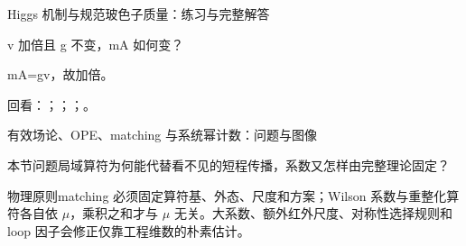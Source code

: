 \begin{frame}[t]{Higgs 机制与规范玻色子质量：练习与完整解答}
\footnotesize
\begin{block}{}v 加倍且 g 不变，mA 如何变？\end{block}
\begin{exampleblock}{}mA=gv，故加倍。\end{exampleblock}
\vfill
\scriptsize 回看：；；；。
\end{frame}

\begin{frame}[t]{有效场论、OPE、matching 与系统幂计数：问题与图像}
\footnotesize
\begin{block}{本节问题}局域算符为何能代替看不见的短程传播，系数又怎样由完整理论固定？\end{block}
\begin{block}{物理原则}\quad matching 必须固定算符基、外态、尺度和方案；Wilson 系数与重整化算符各自依 \ensuremath{\mu}，乘积之和才与 \ensuremath{\mu} 无关。大系数、额外红外尺度、对称性选择规则和 loop 因子会修正仅靠工程维数的朴素估计。\end{block}
\end{frame}

